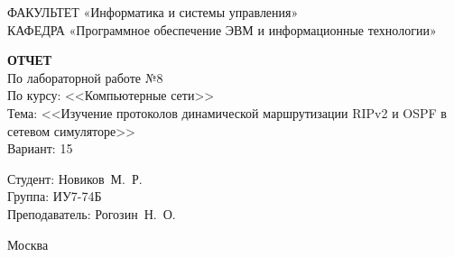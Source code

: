 \begin{titlepage}
	{\doublespacing \small \raggedright ФАКУЛЬТЕТ \hspace{25mm} «Информатика и системы управления»\\
	КАФЕДРА \hspace{5mm} «Программное обеспечение ЭВМ и информационные технологии»\\}

	\vspace{30mm}
	
	\textbf{ОТЧЕТ}\\
	По лабораторной работе №8\\
	По курсу: <<Компьютерные сети>>\\
	Тема: <<Изучение протоколов динамической маршрутизации RIPv2 и OSPF в сетевом симуляторе>>\\
	Вариант: 15

	\vspace{60mm}

	\hspace{70mm} Студент:       \hfill Новиков~М.~Р.\\
	\hspace{70mm} Группа:        \hfill ИУ7-74Б\\
	\hspace{70mm} Преподаватель: \hfill Рогозин~Н.~О.\\

	\vfill
	
	Москва\\
	\the\year
\end{titlepage}

\setcounter{page}{2}